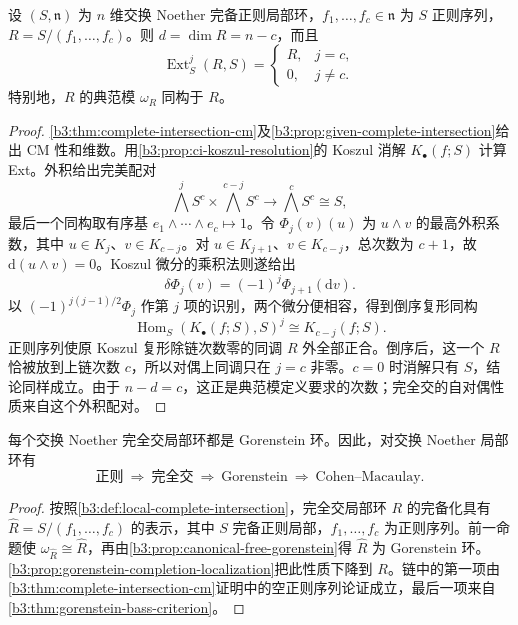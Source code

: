 \begin{proposition}\label{b3:prop:ci-canonical-module}
	设 \((S,\mathfrak n)\) 为 \(n\) 维交换 Noether 完备正则局部环，\(f_1,\ldots,f_c\in\mathfrak n\) 为 \(S\) 正则序列，\(R=S/(f_1,\ldots,f_c)\)。则 \(d=\dim R=n-c\)，而且
	\[
		\operatorname{Ext}_S^j(R,S)=
		\begin{cases}
			R,&j=c,\\
			0,&j\ne c.
		\end{cases}
	\]
	特别地，\(R\) 的典范模 \(\omega_R\) 同构于 \(R\)。
\end{proposition}
\begin{proof}
	\cref{b3:thm:complete-intersection-cm}及\cref{b3:prop:given-complete-intersection}给出 CM 性和维数。用\cref{b3:prop:ci-koszul-resolution}的 Koszul 消解 \(K_\bullet(f;S)\) 计算 Ext。外积给出完美配对
	\[
		\bigwedge^jS^c\times\bigwedge^{c-j}S^c \longrightarrow\bigwedge^cS^c\cong S,
	\]
	最后一个同构取有序基 \(e_1\wedge\cdots\wedge e_c\mapsto1\)。令 \(\Phi_j(v)(u)\) 为 \(u\wedge v\) 的最高外积系数，其中 \(u\in K_j\)、\(v\in K_{c-j}\)。对 \(u\in K_{j+1}\)、\(v\in K_{c-j}\)，总次数为 \(c+1\)，故 \(\mathrm d(u\wedge v)=0\)。Koszul 微分的乘积法则遂给出
	\[
		\delta\Phi_j(v)=(-1)^j\Phi_{j+1}(\mathrm dv).
	\]
	以 \((-1)^{j(j-1)/2}\Phi_j\) 作第 \(j\) 项的识别，两个微分便相容，得到倒序复形同构
	\[
		\operatorname{Hom}_S(K_\bullet(f;S),S)^j \cong K_{c-j}(f;S).
	\]
	正则序列使原 Koszul 复形除链次数零的同调 \(R\) 外全部正合。倒序后，这一个 \(R\) 恰被放到上链次数 \(c\)，所以对偶上同调只在 \(j=c\) 非零。\(c=0\) 时消解只有 \(S\)，结论同样成立。由于 \(n-d=c\)，这正是典范模定义要求的次数；完全交的自对偶性质来自这个外积配对。
\end{proof}

\begin{theorem}\label{b3:thm:complete-intersection-gorenstein}
	每个交换 Noether 完全交局部环都是 Gorenstein 环。因此，对交换 Noether 局部环有
	\[
		\text{正则}\ \Longrightarrow\ \text{完全交}\
		\Longrightarrow\ \text{Gorenstein}\
		\Longrightarrow\ \text{Cohen--Macaulay}.
	\]
\end{theorem}
\begin{proof}
	按照\cref{b3:def:local-complete-intersection}，完全交局部环 \(R\) 的完备化具有 \(\widehat R=S/(f_1,\ldots,f_c)\) 的表示，其中 \(S\) 完备正则局部，\(f_1,\ldots,f_c\) 为正则序列。前一命题使 \(\omega_{\widehat R}\cong\widehat R\)，再由\cref{b3:prop:canonical-free-gorenstein}得 \(\widehat R\) 为 Gorenstein 环。\cref{b3:prop:gorenstein-completion-localization}把此性质下降到 \(R\)。链中的第一项由\cref{b3:thm:complete-intersection-cm}证明中的空正则序列论证成立，最后一项来自\cref{b3:thm:gorenstein-bass-criterion}。
\end{proof}

